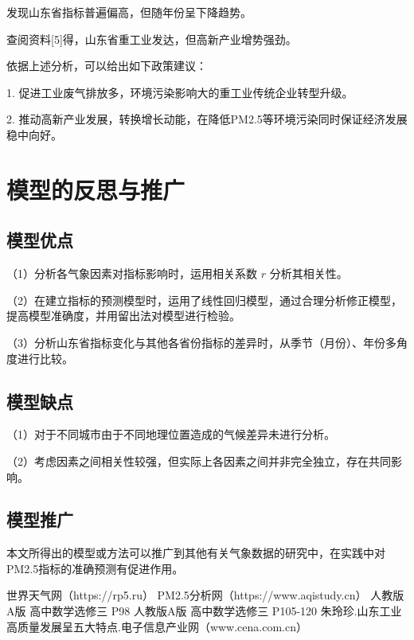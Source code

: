 \documentclass[12pt, a4paper, oneside]{ctexart}
\begin{document}
    发现山东省指标普遍偏高，但随年份呈下降趋势。
    \par 查阅资料[5]得，山东省重工业发达，但高新产业增势强劲。
    \par 依据上述分析，可以给出如下政策建议：
    \par 1. 促进工业废气排放多，环境污染影响大的重工业传统企业转型升级。
    \par 2. 推动高新产业发展，转换增长动能，在降低PM2.5等环境污染同时保证经济发展稳中向好。


    \section{模型的反思与推广}

    \subsection{模型优点}
    （1）分析各气象因素对指标影响时，运用相关系数 $r$ 分析其相关性。
    \par （2）在建立指标的预测模型时，运用了线性回归模型，通过合理分析修正模型，提高模型准确度，并用留出法对模型进行检验。
    \par （3）分析山东省指标变化与其他各省份指标的差异时，从季节（月份）、年份多角度进行比较。

    \subsection{模型缺点}
    （1）对于不同城市由于不同地理位置造成的气候差异未进行分析。
    \par （2）考虑因素之间相关性较强，但实际上各因素之间并非完全独立，存在共同影响。

    \subsection{模型推广}
    本文所得出的模型或方法可以推广到其他有关气象数据的研究中，在实践中对PM2.5指标的准确预测有促进作用。

    \newpage

    \begin{thebibliography}{9}
         世界天气网（https://rp5.ru）
         PM2.5分析网（https://www.aqistudy.cn）
        人教版A版 高中数学选修三 P98
        人教版A版 高中数学选修三 P105-120
        朱玲珍.山东工业高质量发展呈五大特点.电子信息产业网（www.cena.com.cn）
    \end{thebibliography}
\end{document}
